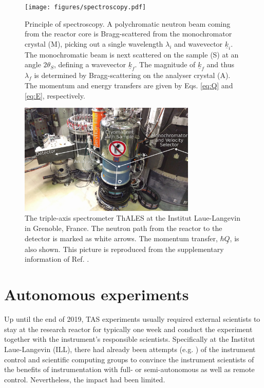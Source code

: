 \begin{figure}[htb]
	\centering
	\texttt{[image: figures/spectroscopy.pdf]}
	\caption{Principle of spectroscopy. A polychromatic neutron beam coming from the reactor core is Bragg-scattered from the monochromator crystal (M), picking out a single wavelength $\lambda_i$ and wavevector $\underline{k}_i$. The monochromatic beam is next scattered on the sample (S) at an angle $2\theta_S$, defining a wavevector $\underline{k}_f$. The magnitude of $\underline{k}_f$ and thus $\lambda_f$ is determined by Bragg-scattering on the analyser crystal (A). The momentum and energy transfers are given by Eqs. \ref{eq:Q} and \ref{eq:E}, respectively. }
	\label{fig:spectroscopy}
\end{figure}

\begin{figure}[htb]
	\centering
	\includegraphics[width=0.75\textwidth]{figures/thales.jpg}
	\caption{The triple-axis spectrometer ThALES \cite{thales} at the Institut Laue-Langevin in Grenoble, France. The neutron path from the reactor to the detector is marked as white arrows. The momentum transfer, $\hbar \underline{Q}$, is also shown. This picture is reproduced from the supplementary information of Ref. \cite{skxpaper}.}
	\label{fig:thales}
\end{figure}



\section{Autonomous experiments \label{sec:autonomous}}

Up until the end of 2019, TAS experiments usually required external scientists to stay at the research reactor for typically one week and conduct the experiment together with the instrument's responsible scientists. Specifically at the Institut Laue-Langevin (ILL), there had already been attempts (e.g. \cite{Song2020}) of the instrument control and scientific computing groups to convince the instrument scientists of the benefits of instrumentation with full- or semi-autonomous as well as remote control. Nevertheless, the impact had been limited.

